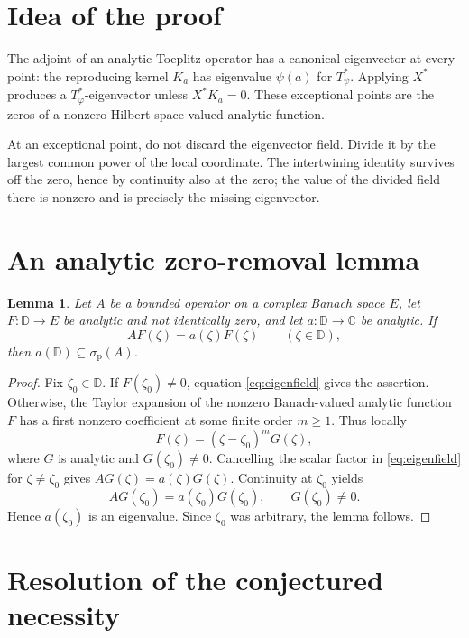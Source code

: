 \documentclass[10pt]{article}
\newtheorem{lemma}[theorem]{Lemma}
\newcommand{\D}{\mathbb D}
\newcommand{\spt}{\sigma_{\mathrm p}}
\begin{document}
\section{Idea of the proof}

The adjoint of an analytic Toeplitz operator has a canonical eigenvector at
every point: the reproducing kernel $K_a$ has eigenvalue
$\overline{\psi(a)}$ for $T_\psi^*$.  Applying $X^*$ produces a
$T_\varphi^*$-eigenvector unless $X^*K_a=0$.  These exceptional points are
the zeros of a nonzero Hilbert-space-valued analytic function.

At an exceptional point, do not discard the eigenvector field.  Divide it by
the largest common power of the local coordinate.  The intertwining identity
survives off the zero, hence by continuity also at the zero; the value of the
divided field there is nonzero and is precisely the missing eigenvector.

\section{An analytic zero-removal lemma}

\begin{lemma}\label{lem:zero-removal}
Let $A$ be a bounded operator on a complex Banach space $E$, let
$F:\D\to E$ be analytic and not identically zero, and let
$a:\D\to\mathbb C$ be analytic.  If
\begin{equation}\label{eq:eigenfield}
 AF(\zeta)=a(\zeta)F(\zeta)\qquad(\zeta\in\D),
\end{equation}
then $a(\D)\subseteq\spt(A)$.
\end{lemma}

\begin{proof}
Fix $\zeta_0\in\D$.  If $F(\zeta_0)\ne0$, equation
\eqref{eq:eigenfield} gives the assertion.  Otherwise, the Taylor expansion
of the nonzero Banach-valued analytic function $F$ has a first nonzero
coefficient at some finite order $m\ge1$.  Thus locally
\[
 F(\zeta)=(\zeta-\zeta_0)^mG(\zeta),
\]
where $G$ is analytic and $G(\zeta_0)\ne0$.  Cancelling the scalar factor in
\eqref{eq:eigenfield} for $\zeta\ne\zeta_0$ gives
$AG(\zeta)=a(\zeta)G(\zeta)$.  Continuity at $\zeta_0$ yields
\[
 AG(\zeta_0)=a(\zeta_0)G(\zeta_0),
 \qquad G(\zeta_0)\ne0.
\]
Hence $a(\zeta_0)$ is an eigenvalue.  Since $\zeta_0$ was arbitrary, the
lemma follows.
\end{proof}

\section{Resolution of the conjectured necessity}
\end{document}
